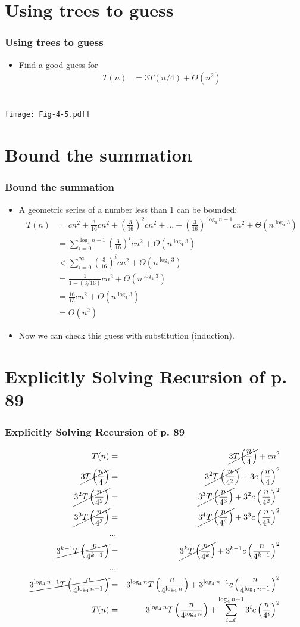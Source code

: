 \documentclass{beamer}
\newcommand{\sect}[1]{
\section{#1}
\begin{frame}[fragile]\frametitle{#1}
}
\newcommand{\bi}{\begin{itemize}}
\newcommand{\ii}{\item}
\newcommand{\ei}{\end{itemize}}
\begin{document}
\sect{Using trees to guess}
\bi
\ii  Find a good guess for
\begin{align*}
  T(n) &= 3T(n/4) + \Theta(n^2)
\end{align*}
\ei

\end{frame}
\sect{}
\texttt{[image: Fig-4-5.pdf]}
\end{frame}

\sect{Bound the summation}
\small
\bi
\ii
A geometric series of a number less than 1 can be bounded:
\begin{align*}
  T(n) &= cn^2 + \frac{3}{16}cn^2 + \left(\frac{3}{16}\right)^2cn^2 + ...
  + \left(\frac{3}{16}\right)^{\log_4 n - 1}cn^2 + \Theta(n^{\log_4 3})\\
  &= \sum_{i=0}^{\log_4n - 1} \left(\frac{3}{16}\right)^icn^2
  + \Theta(n^{\log_4 3})\\
  &< \sum_{i=0}^{\infty} \left(\frac{3}{16}\right)^icn^2
  + \Theta(n^{\log_4 3})\\
  &= \frac{1}{1-(3/16)}cn^2  + \Theta(n^{\log_4 3})\\
  &= \frac{16}{13}cn^2  + \Theta(n^{\log_4 3})\\
  &= O(n^2)
\end{align*}
\ii
Now we can check this guess with substitution (induction).
\ei
\end{frame}


\sect{Explicitly Solving Recursion of p. 89}
\begin{eqnarray*}
T(n) &=& \cancel{3T\left(\frac{n}{4}\right)}+ cn^2\\
\cancel{3T\left(\frac{n}{4}\right)} &=& \cancel{3^2T\left(\frac{n}{4^2}\right) } + 3c\left(\frac{n}{4}\right)^2\\
\cancel{3^2T\left(\frac{n}{4^2}\right)} &=& \cancel{3^3T\left(\frac{n}{4^3}\right)}  + 3^2c\left(\frac{n}{4^2}\right)^2\\
\cancel{3^3T\left(\frac{n}{4^3}\right)} &=& \cancel{3^4T\left(\frac{n}{4^4}\right)}  + 3^3c\left(\frac{n}{4^3}\right)^2\\
&...&\\
\cancel{3^{k-1}T\left(\frac{n}{4^{k-1}}\right)} &=& \cancel{3^{k}T\left(\frac{n}{4^{k}}\right)}  + 3^{k-1}c\left(\frac{n}{4^{k-1}}\right)^2\\
&...&\\
\cancel{3^{\log_4 n-1}T\left(\frac{n}{4^{\log_4 n-1}}\right)} &=& 3^{\log_4 n}T\left(\frac{n}{4^{\log_4 n}}\right)  + 3^{\log_4 n-1}c\left(\frac{n}{4^{\log_4 n-1}}\right)^2\\
T(n) &=&3^{\log_4 n}T\left(\frac{n}{4^{\log_4 n}}\right)  + \sum_{i=0}^{\log_4 n-1}3^{i}c\left(\frac{n}{4^{i}}\right)^2\\
\end{eqnarray*}
\end{frame}
\end{document}
